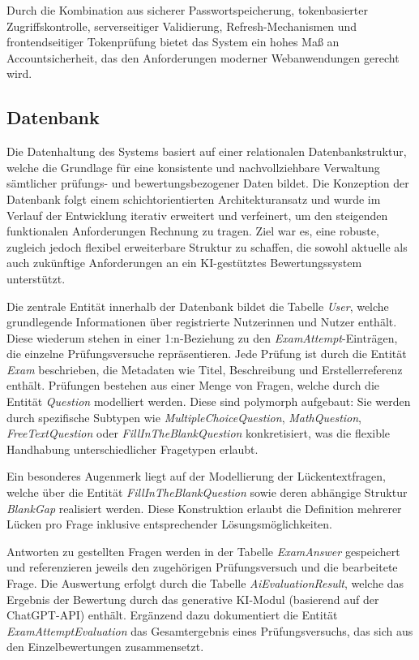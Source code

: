 \documentclass[a4paper,12pt]{article}
\begin{document}
Durch die Kombination aus sicherer Passwortspeicherung, tokenbasierter Zugriffskontrolle, serverseitiger Validierung, Refresh-Mechanismen und frontendseitiger Tokenprüfung bietet das System ein hohes Maß an Accountsicherheit, das den Anforderungen moderner Webanwendungen gerecht wird.



\subsection{Datenbank}
Die Datenhaltung des Systems basiert auf einer relationalen Datenbankstruktur, welche die Grundlage für eine konsistente und nachvollziehbare Verwaltung sämtlicher prüfungs- und bewertungsbezogener Daten bildet. Die Konzeption der Datenbank folgt einem schichtorientierten Architekturansatz und wurde im Verlauf der Entwicklung iterativ erweitert und verfeinert, um den steigenden funktionalen Anforderungen Rechnung zu tragen. Ziel war es, eine robuste, zugleich jedoch flexibel erweiterbare Struktur zu schaffen, die sowohl aktuelle als auch zukünftige Anforderungen an ein KI-gestütztes Bewertungssystem unterstützt.

Die zentrale Entität innerhalb der Datenbank bildet die Tabelle \textit{User}, welche grundlegende Informationen über registrierte Nutzerinnen und Nutzer enthält. Diese wiederum stehen in einer 1:n-Beziehung zu den \textit{ExamAttempt}-Einträgen, die einzelne Prüfungsversuche repräsentieren. Jede Prüfung ist durch die Entität \textit{Exam} beschrieben, die Metadaten wie Titel, Beschreibung und Erstellerreferenz enthält. Prüfungen bestehen aus einer Menge von Fragen, welche durch die Entität \textit{Question} modelliert werden. Diese sind polymorph aufgebaut: Sie werden durch spezifische Subtypen wie \textit{MultipleChoiceQuestion}, \textit{MathQuestion}, \textit{FreeTextQuestion} oder \textit{FillInTheBlankQuestion} konkretisiert, was die flexible Handhabung unterschiedlicher Fragetypen erlaubt.

Ein besonderes Augenmerk liegt auf der Modellierung der Lückentextfragen, welche über die Entität \textit{FillInTheBlankQuestion} sowie deren abhängige Struktur \textit{BlankGap} realisiert werden. Diese Konstruktion erlaubt die Definition mehrerer Lücken pro Frage inklusive entsprechender Lösungsmöglichkeiten.

Antworten zu gestellten Fragen werden in der Tabelle \textit{ExamAnswer} gespeichert und referenzieren jeweils den zugehörigen Prüfungsversuch und die bearbeitete Frage. Die Auswertung erfolgt durch die Tabelle \textit{AiEvaluationResult}, welche das Ergebnis der Bewertung durch das generative KI-Modul (basierend auf der ChatGPT-API) enthält. Ergänzend dazu dokumentiert die Entität \textit{ExamAttemptEvaluation} das Gesamtergebnis eines Prüfungsversuchs, das sich aus den Einzelbewertungen zusammensetzt.
\end{document}
